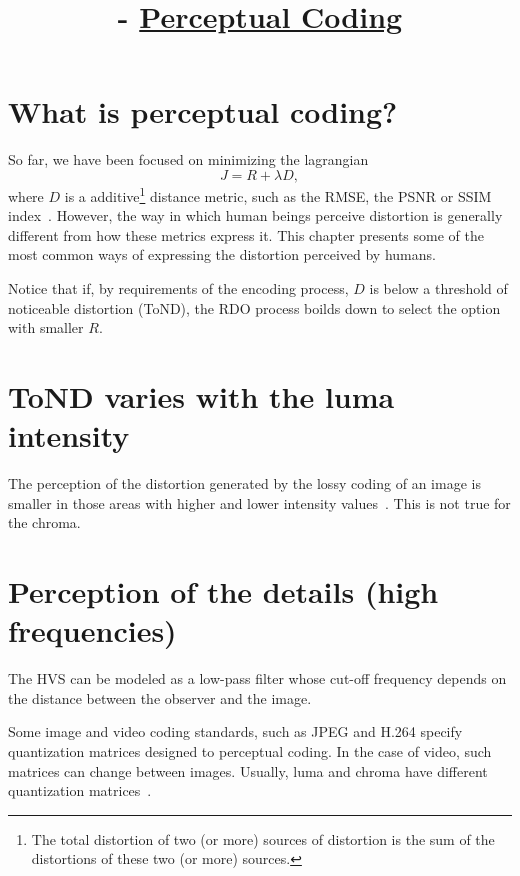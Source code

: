 

\title{\SM{} - \href{https://github.com/Sistemas-Multimedia/Sistemas-Multimedia.github.io/tree/master/contents/perceptual_coding}{Perceptual Coding}}

\maketitle
\tableofcontents

\section{What is perceptual coding?}

So far, we have been focused on minimizing the lagrangian~\cite{sullivan1998rate}
\begin{equation}
  J = R + \lambda D,
\end{equation}
where $D$ is a additive\footnote{The total distortion of two (or more)
sources of distortion is the sum of the distortions of these two (or
more) sources.} distance metric, such as the RMSE, the PSNR or SSIM
index~\cite{wang2004image}. However, the way in which human beings
perceive distortion is generally different from how these metrics
express it. This chapter presents some of the most common ways of
expressing the distortion perceived by humans.

Notice that if, by requirements of the encoding process, $D$ is below
a threshold of noticeable distortion (ToND), the RDO process boilds down to
select the option with smaller $R$.

\section{ToND varies with the luma intensity}

The perception of the distortion generated by the lossy coding of an
image is smaller in those areas with higher and lower intensity
values~\cite{naccari2014perceptually}. This is not true for the chroma.

\section{Perception of the details (high frequencies)}
The HVS can be modeled as a low-pass filter whose cut-off frequency
depends on the distance between the observer and the image.

Some image and video coding standards, such as JPEG and H.264 specify
quantization matrices designed to perceptual coding. In the case of
video, such matrices can change between images. Usually, luma and
chroma have different quantization
matrices~\cite{naccari2014perceptually}.

